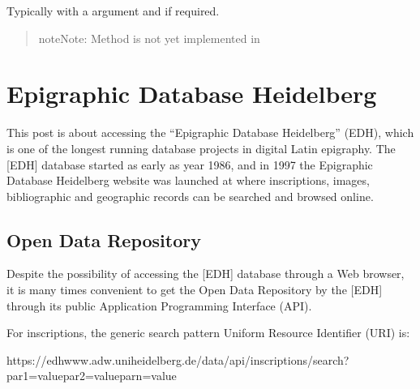 \documentclass[a4paper,12pt,english]{sphinxhowto}
\begin{document}
\begin{sphinxVerbatim}[commandchars=\\\{\},formatcom=\footnotesize]
   
\end{sphinxVerbatim}

Typically with a  argument and  if required.
\begin{quote}

\begin{sphinxadmonition}{note}{Note:}
Method  is not yet implemented in 
\end{sphinxadmonition}
\end{quote}



\section{Epigraphic Database Heidelberg}
\label{\detokenize{Epigraphic:epigraphic-database-heidelberg}}\label{\detokenize{Epigraphic:edh}}\label{\detokenize{Epigraphic::doc}}
This post is about accessing the “Epigraphic Database Heidelberg” (EDH),
which is one of the longest running database projects in digital Latin
epigraphy. The {[}EDH{]} database started as early as year 1986, and in 1997 the Epigraphic
Database Heidelberg website was launched at
 where inscriptions, images,
bibliographic and geographic records can be searched and browsed online.


\subsection{Open Data Repository}
\label{\detokenize{Epigraphic:open-data-repository}}
Despite the possibility of accessing the {[}EDH{]} database through a Web browser, it is
many times convenient to get the Open Data Repository by the
{[}EDH{]} through its
public Application Programming Interface (API).

For inscriptions, the generic search pattern Uniform Resource Identifier
(URI) is:

\begin{sphinxVerbatim}[commandchars=\\\{\},formatcom=\footnotesize]
https://edh\PYGZhy{}www.adw.uni\PYGZhy{}heidelberg.de/data/api/inscriptions/search?par\PYGZus{}1=value\PYGZam{}par\PYGZus{}2=value\PYGZam{}par\PYGZus{}n=value
\end{sphinxVerbatim}
\end{document}
